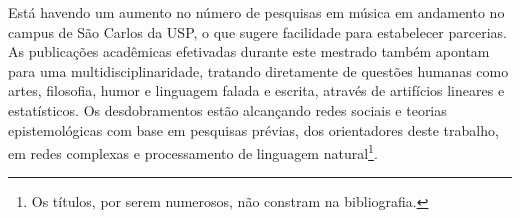 Está havendo um aumento no número de pesquisas em música em andamento no campus de São Carlos da USP, o que sugere facilidade para estabelecer parcerias.
As publicações acadêmicas efetivadas durante este mestrado também apontam para uma multidisciplinaridade,
tratando diretamente de questões humanas como artes, filosofia, humor e linguagem falada e escrita, através de artifícios lineares e estatísticos.\cite{FabbriSTAT,FabbriACL,FabbriComplenetVoz,FabbriComplenetTexto} Os desdobramentos estão alcançando redes sociais e teorias epistemológicas com base em pesquisas prévias, dos orientadores deste trabalho, em redes complexas e processamento de linguagem natural\footnote{Os títulos, por serem numerosos, não constram na bibliografia.}. 
